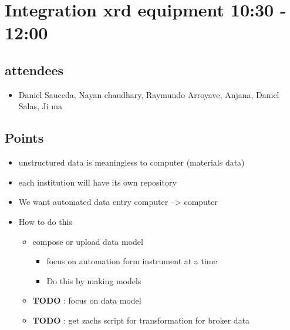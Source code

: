 \documentclass[11pt]{article}
\begin{document}
\section{Integration xrd equipment 10:30 - 12:00}
\label{sec:orgheadline7}
\subsection{attendees}
\label{sec:orgheadline4}
\begin{itemize}
\item Daniel Sauceda, Nayan chaudhary, Raymundo Arroyave, Anjana, Daniel Salas, Ji ma
\end{itemize}
\subsection{Points}
\label{sec:orgheadline5}
\begin{itemize}
\item unstructured data is meaningless to computer (materials data)
\item each institution will have its own repository
\item We want automated data entry computer --> computer
\item How to do this
\begin{itemize}
\item compose or upload data model
\begin{itemize}
\item focus on automation form instrument at a time
\item Do this by making models
\end{itemize}
\item \textbf{TODO} : focus on data model
\item \textbf{TODO} : get zachs script for transformation for broker data
\end{itemize}
\end{itemize}
\end{document}
